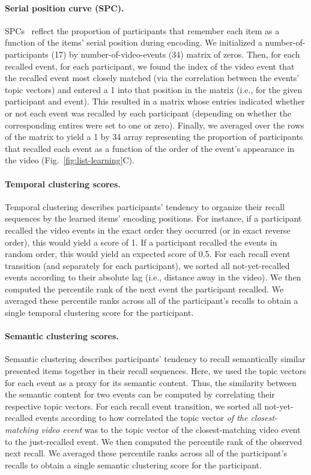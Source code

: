 \documentclass{article}
\begin{document}
\paragraph{Serial position curve (SPC).} SPCs~\citep{Murd62a} reflect the proportion of participants that remember each item as a function of the items' serial position during encoding. We initialized a number-of-participants (17) by number-of-video-events (34) matrix of zeros. Then, for each recalled event, for each participant, we found the index of the video event that the recalled event most closely matched (via the correlation between the events' topic vectors) and entered a 1 into that position in the matrix (i.e., for the given participant and event). This resulted in a matrix whose entries indicated whether or not each event was recalled by each participant (depending on whether the corresponding entires were set to one or zero).  Finally, we averaged over the rows of the matrix to yield a 1 by 34 array representing the proportion of participants that recalled each event as a function of the order of the event's appearance in the video (Fig.~\ref{fig:list-learning}C).

\paragraph{Temporal clustering scores.} Temporal clustering describes participants' tendency to organize their recall sequences by the learned items' encoding positions.  For instance, if a participant recalled the video events in the exact order they occurred (or in exact reverse order), this would yield a score of 1.  If a participant recalled the events in random order, this would yield an expected score of 0.5.  For each recall event transition (and separately for each participant), we sorted all not-yet-recalled events according to their absolute lag (i.e., distance away in the video).  We then computed the percentile rank of the next event the participant recalled.  We averaged these percentile ranks across all of the participant's recalls to obtain a single temporal clustering score for the participant.

\paragraph{Semantic clustering scores.} Semantic clustering describes participants' tendency to recall semantically similar presented items together in their recall sequences.  Here, we used the topic vectors for each event as a proxy for its semantic content. Thus, the similarity between the semantic content for two events can be computed by correlating their respective topic vectors.  For each recall event transition, we sorted all not-yet-recalled events according to how correlated the topic vector \textit{of the closest-matching video event} was to the topic vector of the closest-matching video event to the just-recalled event.  We then computed the percentile rank of the observed next recall.  We averaged these percentile ranks across all of the participant's recalls to obtain a single semantic clustering score for the participant.
\end{document}
